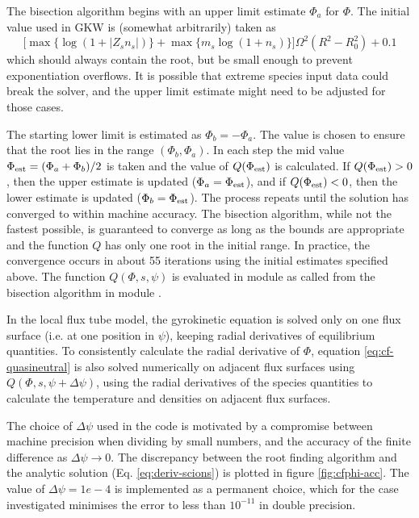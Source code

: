 The bisection algorithm begins with an upper limit estimate $\Phi_a$ for $\Phi$.  The initial value used in GKW is (somewhat arbitrarily) taken as
\begin{equation}
  \biggr[\max\{\log(1+|Z_s n_s|)\}+\max\{m_s\log(1+n_s)\}\biggr]\Omega^2 (R^2-R_0^2) + 0.1
\end{equation}
which should always contain the root, but be small enough to prevent exponentiation overflows.  It is possible that extreme
species input data could break the solver, and the upper limit estimate might need to be adjusted for those cases.

The starting lower limit is estimated as $\Phi_b=-\Phi_a$. The value is chosen to ensure that the root lies in the range $(\Phi_b,\Phi_a)$. In each step the mid value $\Phi_{\rm est}=(\Phi_a+\Phi_b)/2$ is taken and the value of $Q(\Phi_{\rm est})$ is calculated.  If $Q(\Phi_{\rm est})>0$, then the upper estimate is updated ($\Phi_a=\Phi_{\rm est}$), and if $Q(\Phi_{\rm est})<0$, then the lower estimate is updated ($\Phi_b=\Phi_{\rm est}$).  The process repeats until the solution has converged to within machine accuracy.  The bisection algorithm, while not the fastest possible, is guaranteed to converge as long as the bounds are appropriate and the function $Q$ has only one root in the initial range.  In practice, the convergence occurs in about 55 iterations using the initial estimates specified above.  The function $Q(\Phi,s,\psi)$ is evaluated in module  as  called from the bisection algorithm  in module .

In the local flux tube model, the gyrokinetic equation is solved only on one flux surface (i.e. at one position in $\psi$), keeping radial derivatives of equilibrium quantities.  To consistently calculate the radial derivative of $\Phi$, equation \ref{eq:cf-quasineutral} is also solved numerically on adjacent flux surfaces using $Q(\Phi,s,\psi+\Delta \psi)$, using the radial derivatives of the species quantities to calculate the temperature and densities on adjacent flux surfaces.

The choice of $\Delta \psi$ used in the code is motivated by a compromise between machine precision when dividing by small numbers, and the accuracy of the finite difference as $\Delta \psi \rightarrow 0$.  The discrepancy between the root finding algorithm and the analytic solution (Eq. \ref{eq:deriv-scions}) is plotted in figure \ref{fig:cfphi-acc}. The value of $\Delta \psi = 1e-4$ is implemented as a permanent choice, which for the case investigated minimises the error to less than $10^{-11}$ in double precision.

